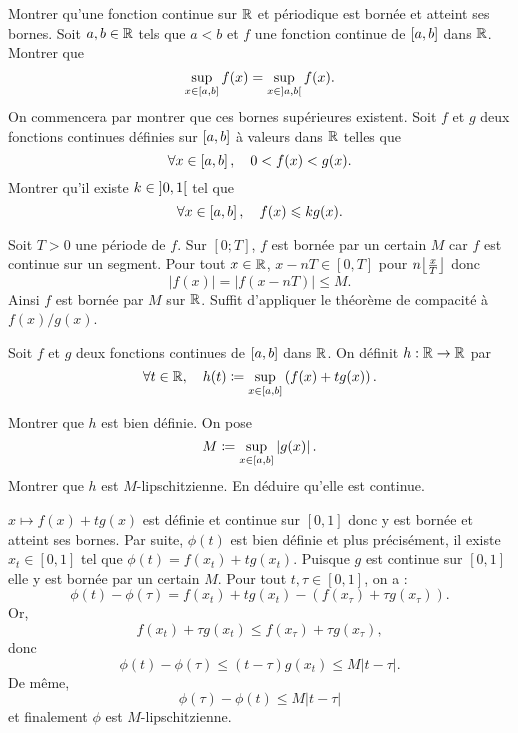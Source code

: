 \documentclass{magnolia}
\begin{document}

\begin{questions}
\question Montrer qu'une fonction continue sur $\mathbb{R}$ et périodique est bornée et
  atteint ses bornes.
\question Soit $a,b\in\mathbb{R}$ tels que $a<b$ et $f$ une fonction continue de $\left[a,b\right]$
  dans $\mathbb{R}$. Montrer que
  \[\sup_{x\in\left[a,b\right]} f(x) = \sup_{x\in\left]a,b\right[} f(x).\]
  On commencera par montrer que ces bornes supérieures existent.
\question Soit $f$ et $g$ deux fonctions continues définies sur $\left[a,b\right]$ à
  valeurs dans $\mathbb{R}$ telles que
  \[\forall x\in\left[a,b\right] ,\quad 0<f(x)<g(x).\]
  Montrer qu'il existe $k\in\left]0,1\right[$ tel que
  \[\forall x\in\left[a,b\right] ,\quad f(x)\leqslant kg(x).\]
\end{questions}

\begin{sol}
\begin{questions}
\question Soit $T > 0$ une période de $f$.
Sur $[0 ; T]$, $f$ est bornée par un certain $M$ car $f$ est continue sur un segment. Pour tout $x\in\mathbb{R}$, $x-nT \in [0,T]$ pour $n\ent{\frac{x}{T}}$ donc
$$|f(x)| = |f(x-nT)|\leq M.$$
Ainsi $f$ est bornée par $M$ sur $\mathbb{R}$.
\question 
\question Suffit d'appliquer le théorème de compacité à $f(x)/g(x)$. 
\end{questions}
\end{sol}


Soit $f$ et $g$ deux fonctions continues de $\left[a,b\right]$ dans $\mathbb{R}$.
On définit $h:\mathbb{R}\to\mathbb{R}$ par
\[\forall t\in\mathbb{R} ,\quad h(t)\coloneqq\sup_{x\in\left[a,b\right]}
  \left(f(x)+t g(x)\right).\]
\begin{questions}
\question Montrer que $h$ est bien définie.
\question On pose 
\[M\coloneqq \sup_{x\in\left[a,b\right]} \left|g(x)\right|.\]
Montrer que $h$ est $M$-lipschitzienne. En déduire qu'elle est continue.
\end{questions}

\begin{sol}
  $x\mapsto f(x)+tg(x)$ est définie et continue sur $[0,1]$ donc y est bornée et atteint ses bornes. Par suite, $\phi(t)$ est bien définie et plus précisément, il existe $x_t \in [0,1]$ tel que $\phi(t)=f(x_t)+tg(x_t)$. Puisque $g$ est continue sur $[0,1]$ elle y est bornée par un certain $M$. Pour tout $t,\tau \in [0,1]$, on a :
  $$\phi(t)-\phi(\tau)=f(x_t)+tg(x_t)-(f(x_\tau)+\tau g(x_\tau)).$$ Or, $$f(x_t)+\tau g(x_t)\leq f(x_\tau)+\tau g(x_\tau),$$ donc $$\phi(t)-\phi(\tau)\leq (t-\tau)g(x_t)\leq M|t-\tau|.$$
  De même, $$\phi(\tau)-\phi(t)\leq M|t-\tau|$$ et finalement $\phi$ est $M$-lipschitzienne.
\end{sol}
\end{document}
